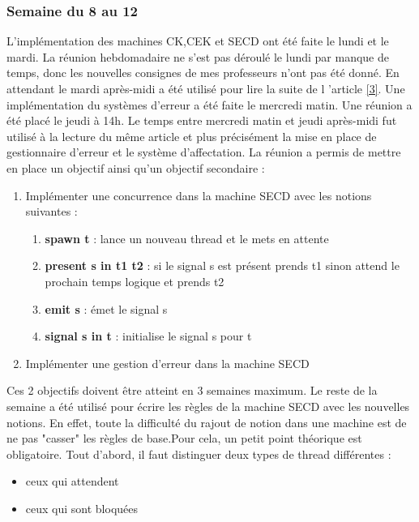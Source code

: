 \documentclass[10pt,a4paper]{article}
\begin{document}
		\newpage
		
		\subsubsection{Semaine du 8 au 12}
		L'implémentation des machines CK,CEK et SECD ont été faite le lundi et le mardi. La réunion hebdomadaire ne s'est pas déroulé le lundi par manque de temps, donc les nouvelles consignes de mes professeurs n'ont pas été donné. En attendant le mardi après-midi a été utilisé pour lire la suite de l 'article \hyperref[Calculi]{[3]}.
		\smallbreak
		Une implémentation du systèmes d'erreur a été faite le mercredi matin. 
		Une réunion a été placé le jeudi à 14h. Le temps entre mercredi matin et jeudi après-midi fut utilisé à la lecture du même article et plus précisément la mise en place de gestionnaire d'erreur et le système d'affectation.
		\smallbreak
		La réunion a permis de mettre en place un objectif ainsi qu'un objectif secondaire :
		\begin{enumerate}
			\item Implémenter une concurrence dans la machine SECD avec les notions suivantes :
			\begin{enumerate}
				\item \textbf{spawn t} : lance un nouveau thread et le mets en attente
				\item \textbf{present s in t1 t2} : si le signal s est présent prends t1 sinon attend le prochain temps logique et prends t2
				\item \textbf{emit s} : émet le signal s
				\item \textbf{signal s in t} : initialise le signal s pour t 
			\end{enumerate}
			\item Implémenter une gestion d'erreur dans la machine SECD 
		\end{enumerate}
		Ces 2 objectifs doivent être atteint en 3 semaines maximum.
		\medbreak
		Le reste de la semaine a été utilisé pour écrire les règles de la machine SECD avec les nouvelles notions. En effet, toute la difficulté du rajout de notion dans une machine est de ne pas "casser" les règles de base.Pour cela, un petit point théorique est obligatoire.
		\smallbreak
		Tout d'abord, il faut distinguer deux types de thread différentes :
		\begin{itemize}
			\item ceux qui attendent
			\item ceux qui sont bloquées
		\end{itemize}
		\bigbreak
		
\end{document}
